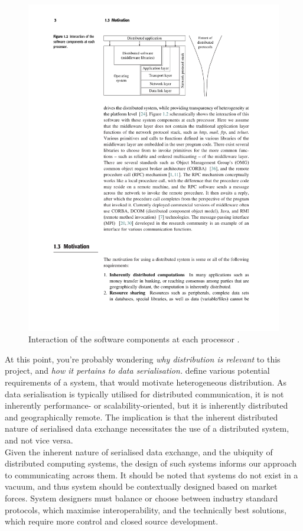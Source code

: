 \documentclass[../report.tex]{subfiles}
\begin{document}
\begin{figure}[h!]
\centering
\includegraphics[width=0.8\linewidth]{figures/processinteraction.pdf}
\caption{Interaction of the software components at each processor \cite[3]{kshemkalyani2011distributed}.}
\label{fig:processinteraction}
\end{figure}

At this point, you're probably wondering \textit{why distribution is relevant} to this project, and \textit{how it pertains to data serialisation.} \cite{kshemkalyani2011distributed} define various potential requirements of a system, that would motivate heterogeneous distribution. As data serialisation is typically utilised for distributed communication, it is not inherently performance- or scalability-oriented, but it is inherently distributed and geographically remote. The implication is that the inherent distributed nature of serialised data exchange necessitates the use of a distributed system, and not vice versa. \\

Given the inherent nature of serialised data exchange, and the ubiquity of distributed computing systems, the design of such systems informs our approach to communicating across them. It should be noted that systems do not exist in a vacuum, and thus system should be contextually designed based on market forces. System designers must balance or choose between industry standard protocols, which maximise interoperability, and the technically best solutions, which require more control and closed source development.
\end{document}
